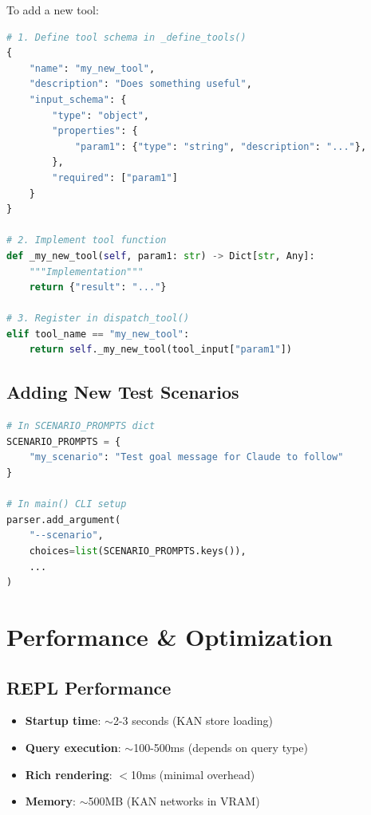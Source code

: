 \documentclass[12pt,oneside,openany]{book}
\begin{document}
To add a new tool:

\begin{lstlisting}[language=Python]
# 1. Define tool schema in _define_tools()
{
    "name": "my_new_tool",
    "description": "Does something useful",
    "input_schema": {
        "type": "object",
        "properties": {
            "param1": {"type": "string", "description": "..."},
        },
        "required": ["param1"]
    }
}

# 2. Implement tool function
def _my_new_tool(self, param1: str) -> Dict[str, Any]:
    """Implementation"""
    return {"result": "..."}

# 3. Register in dispatch_tool()
elif tool_name == "my_new_tool":
    return self._my_new_tool(tool_input["param1"])
\end{lstlisting}

\section{Adding New Test Scenarios}

\begin{lstlisting}[language=Python]
# In SCENARIO_PROMPTS dict
SCENARIO_PROMPTS = {
    "my_scenario": "Test goal message for Claude to follow"
}

# In main() CLI setup
parser.add_argument(
    "--scenario",
    choices=list(SCENARIO_PROMPTS.keys()),
    ...
)
\end{lstlisting}

\chapter{Performance \& Optimization}

\section{REPL Performance}

\begin{itemize}
    \item \textbf{Startup time}: $\sim$2-3 seconds (KAN store loading)
    \item \textbf{Query execution}: $\sim$100-500ms (depends on query type)
    \item \textbf{Rich rendering}: $<$10ms (minimal overhead)
    \item \textbf{Memory}: $\sim$500MB (KAN networks in VRAM)
\end{itemize}
\end{document}
